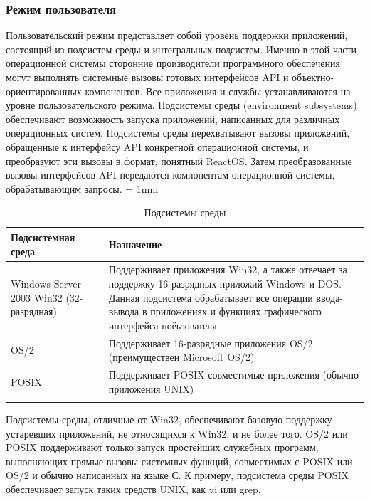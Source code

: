 \subsubsection{Режим пользователя}
Пользовательский режим представляет собой уровень поддержки приложений, состоящий из подсистем среды и интегральных подсистем. Именно в этой части операционной системы сторонние производители программного обеспечения могут выполнять системные вызовы готовых интерфейсов API и объектно-ориентированных компонентов. Все приложения и службы устанавливаются на уровне пользовательского режима.
Подсистемы среды (environment subsystems) обеспечивают возможность запуска приложений, написанных для различных операционных систем. Подсистемы среды перехватывают вызовы приложений, обращенные к интерфейсу API конкретной операционной системы, и преобразуют эти вызовы в формат, понятный ReactOS. Затем преобразованные вызовы интерфейсов API передаются компонентам операционной системы, обрабатывающим запросы. 
\tabulinesep = 1mm
\begin{longtabu} to \textwidth {|X[l, m ] |X[2, l, m ] |}\firsthline\hline
\textbf{Подсистемная среда}&\textbf{Назначение}\\ \hline \endfirsthead
Windows Server 2003 Win32 (32-разрядная)&Поддерживает приложения Win32, а также отвечает за поддержку 16-разрядных приложий Windows и DOS. Данная подсистема обрабатывает все операции ввода-вывода в приложениях и функциях графического интерфейса поёьзователя\\ \hline
OS/2 & Поддерживает 16-разрядные приложения OS/2 (преимуществен Microsoft OS/2)\\ \hline
POSIX&Поддерживает POSIX-совместимые приложения (обычно приложения UNIX)\\ \hline
\caption{Подсистемы среды}
\end{longtabu}
Подсистемы среды, отличные от Win32, обеспечивают базовую поддержку устаревших приложений, не относящихся к Win32, и не более того. OS/2 или POSIX поддерживают только запуск простейших служебных программ, выполняющих прямые вызовы системных функций, совместимых с POSIX или OS/2 и обычно написанных на языке С. К примеру, подсистема среды POSIX обеспечивает запуск таких средств UNIX, как vi или grep.

